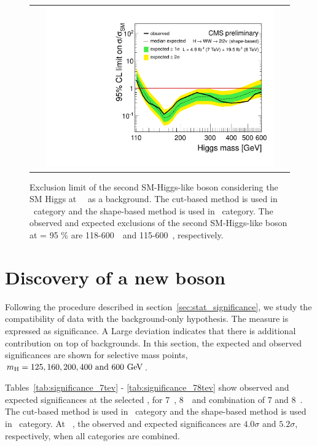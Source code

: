 \begin{figure}[htp] 
\centering 
\begin{tabular}{c} 
\includegraphics[width=0.9\textwidth]{figures/ana_Moriond13_2D_SMH_7p8TeV_bdt_from110to600_logx1_logy1.pdf} 
\end{tabular} 
\caption{Exclusion limit of the second SM-Higgs-like boson considering the 
SM Higgs at ~\GeV\ as a background.
The cut-based method is used in \SF\ category and the shape-based method 
is used in \DF\ category.
The observed and expected exclusions of the second SM-Higgs-like boson at \CLs = 95 \% 
are 118-600~\GeV\ and 115-600~\GeV, respectively.} 
\label{fig:limit78_secondhiggs} 
\end{figure} 




\section{Discovery of a new boson}

Following the procedure described in section~\ref{sec:stat_significance}, 
we study the compatibility of data with the background-only hypothesis. 
The measure is expressed as significance. A Large deviation indicates 
that there is additional contribution on top of backgrounds. 
In this section, the expected and observed significances are shown
for selective mass points, $m_{\mathrm{H}} = 125, 160, 200, 400 \textrm{ and } 600~\mathrm{Ge\kern -0.1em V}$.  

Tables~\ref{tab:significance_7tev} - \ref{tab:significance_78tev}  
show observed and expected significances at the selected \mHi, 
for 7~\TeV, 8~\TeV\ and combination of 7 and 8~\TeV.
The cut-based method is used in \SF\ category 
and the shape-based method is used in \DF\ category.
At ~\GeV, the observed and expected significances
are $4.0\sigma$ and $5.2\sigma$, respectively, 
when all categories are combined.


